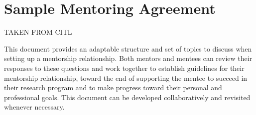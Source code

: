 \documentclass[fleqn,10pt]{wlscirep}
\begin{document}


\newpage








\newpage
\section{Sample Mentoring Agreement}

TAKEN FROM CITL

This document provides an adaptable structure and set of topics to discuss when setting up a mentorship relationship. Both mentors and mentees can review their responses to these questions and work together to establish guidelines for their mentorship relationship, toward the end of supporting the mentee to succeed in their research program and to make progress toward their personal and professional goals. This document can be developed collaboratively and revisited whenever necessary.
\end{document}
